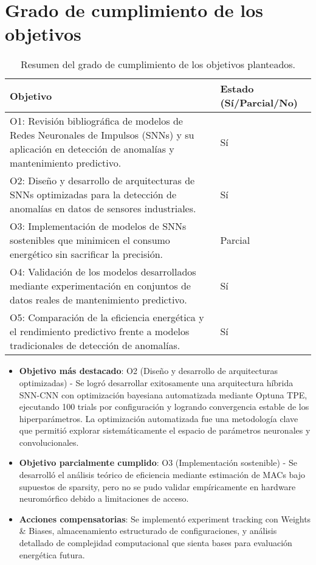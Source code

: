 \section{Grado de cumplimiento de los objetivos}
\begin{table}[htbp]
    \centering
    \small
    \begin{tabular}{p{}p{}}
        \hline\hline
        \textbf{Objetivo} & \textbf{Estado (Sí/Parcial/No)} \\
        \hline
        O1: Revisión bibliográfica de modelos de Redes Neuronales de Impulsos (SNNs) y su aplicación en detección de anomalías y mantenimiento predictivo. & Sí \\
        O2: Diseño y desarrollo de arquitecturas de SNNs optimizadas para la detección de anomalías en datos de sensores industriales. & Sí \\
        O3: Implementación de modelos de SNNs sostenibles que minimicen el consumo energético sin sacrificar la precisión. & Parcial \\
        O4: Validación de los modelos desarrollados mediante experimentación en conjuntos de datos reales de mantenimiento predictivo. & Sí \\
        O5: Comparación de la eficiencia energética y el rendimiento predictivo frente a modelos tradicionales de detección de anomalías. & Sí \\ 
        \hline\hline
    \end{tabular}
    \caption{Resumen del grado de cumplimiento de los objetivos planteados.}
    \label{tab:objetivos-cumplimiento}
\end{table}


\begin{itemize}
    \item \textbf{Objetivo más destacado}: O2 (Diseño y desarrollo de arquitecturas optimizadas) - Se logró desarrollar exitosamente una arquitectura híbrida SNN-CNN con optimización bayesiana automatizada mediante Optuna TPE, ejecutando 100 trials por configuración y logrando convergencia estable de los hiperparámetros. La optimización automatizada fue una metodología clave que permitió explorar sistemáticamente el espacio de parámetros neuronales y convolucionales.
    \item \textbf{Objetivo parcialmente cumplido}: O3 (Implementación sostenible) - Se desarrolló el análisis teórico de eficiencia mediante estimación de MACs bajo supuestos de sparsity, pero no se pudo validar empíricamente en hardware neuromórfico debido a limitaciones de acceso.
    \item \textbf{Acciones compensatorias}: Se implementó experiment tracking con Weights \& Biases, almacenamiento estructurado de configuraciones, y análisis detallado de complejidad computacional que sienta bases para evaluación energética futura.
\end{itemize}

